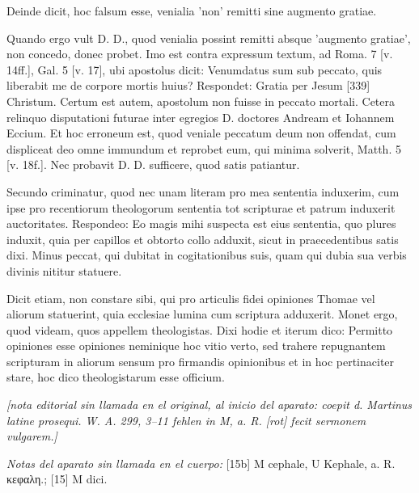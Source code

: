 Deinde dicit, hoc falsum esse, venialia 'non' remitti sine augmento gratiae.

Quando ergo vult D. D., quod venialia possint remitti absque 'augmento gratiae', non concedo, donec probet. Imo est contra expressum textum, ad Roma. 7 [v. 14ff.], Gal. 5 [v. 17], ubi apostolus dicit: Venumdatus sum sub peccato, quis liberabit me de corpore mortis huius? Respondet: Gratia per Jesum [339] Christum. Certum est autem, apostolum non fuisse in peccato mortali. Cetera relinquo disputationi futurae inter egregios D. doctores Andream et Iohannem Eccium. Et hoc erroneum est, quod veniale peccatum deum non offendat, cum displiceat deo omne immundum et reprobet eum, qui minima solverit, Matth. 5 [v. 18f.]. Nec probavit D. D. sufficere, quod satis patiantur.

Secundo criminatur, quod nec unam literam pro mea sententia induxerim, cum ipse pro recentiorum theologorum sententia tot scripturae et patrum induxerit auctoritates. Respondeo: Eo magis mihi suspecta est eius sententia, quo plures induxit, quia per capillos et obtorto collo adduxit, sicut in praecedentibus satis dixi. Minus peccat, qui dubitat in cogitationibus suis, quam qui dubia sua verbis divinis nititur statuere.

Dicit etiam, non constare sibi, qui pro articulis fidei opiniones Thomae vel aliorum statuerint, quia ecclesiae lumina cum scriptura adduxerit. Monet ergo, quod videam, quos appellem theologistas. Dixi hodie et iterum dico: Permitto opiniones esse opiniones neminique hoc vitio verto, sed trahere repugnantem scripturam in aliorum sensum pro firmandis opinionibus et in hoc pertinaciter stare, hoc dico theologistarum esse officium.

\noindent\textit{[nota editorial sin llamada en el original, al inicio del aparato: coepit d. Martinus latine prosequi. W. A. 299, 3–11 fehlen in M, a. R. [rot] fecit sermonem vulgarem.]}

\noindent\textit{Notas del aparato sin llamada en el cuerpo:} [15b] M cephale, U Kephale, a. R. κεφαλη.; [15] M dici.
